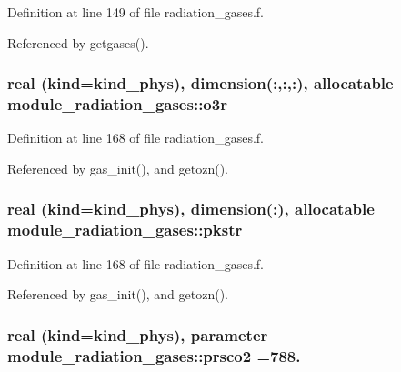 Definition at line 149 of file radiation\+\_\+gases.\+f.



Referenced by getgases().

\subsubsection[{\texorpdfstring{o3r}{o3r}}]{\setlength{\rightskip}{0pt plus 5cm}real (kind=kind\+\_\+phys), dimension(\+:,\+:,\+:), allocatable module\+\_\+radiation\+\_\+gases\+::o3r\hspace{0.3cm}{\ttfamily [private]}}\hypertarget{namespacemodule__radiation__gases_ad18392d991a9ef4b6ff0e8e822176a18}{}\label{namespacemodule__radiation__gases_ad18392d991a9ef4b6ff0e8e822176a18}


Definition at line 168 of file radiation\+\_\+gases.\+f.



Referenced by gas\+\_\+init(), and getozn().

\subsubsection[{\texorpdfstring{pkstr}{pkstr}}]{\setlength{\rightskip}{0pt plus 5cm}real (kind=kind\+\_\+phys), dimension(\+:), allocatable module\+\_\+radiation\+\_\+gases\+::pkstr\hspace{0.3cm}{\ttfamily [private]}}\hypertarget{namespacemodule__radiation__gases_ac7466def3963591ebfc48298806b1f6a}{}\label{namespacemodule__radiation__gases_ac7466def3963591ebfc48298806b1f6a}


Definition at line 168 of file radiation\+\_\+gases.\+f.



Referenced by gas\+\_\+init(), and getozn().

\subsubsection[{\texorpdfstring{prsco2}{prsco2}}]{\setlength{\rightskip}{0pt plus 5cm}real (kind=kind\+\_\+phys), parameter module\+\_\+radiation\+\_\+gases\+::prsco2 =788.\hspace{0.3cm}{\ttfamily [private]}}\hypertarget{namespacemodule__radiation__gases_ab09dc05b8a02e9a0b56991508b599708}{}\label{namespacemodule__radiation__gases_ab09dc05b8a02e9a0b56991508b599708}


